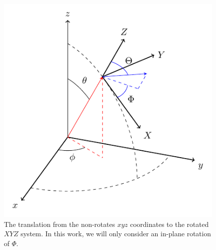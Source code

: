 \documentclass[aps,prb,10pt,letterpaper,notitlepage]{revtex4-1}
\begin{document}
\begin{figure}[b]
\centering
\includegraphics[width=0.4\linewidth]{axes}
\caption{The translation from the non-rotates $xyz$ coordinates to the rotated
$XYZ$ system. In this work, we will only consider an in-plane rotation of
$\Phi$.}
\label{fig:axes}
\end{figure}
\end{document}
